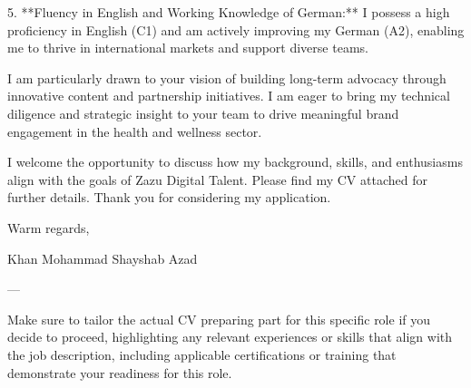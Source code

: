 5. **Fluency in English and Working Knowledge of German:** I possess a high proficiency in English (C1) and am actively improving my German (A2), enabling me to thrive in international markets and support diverse teams.

I am particularly drawn to your vision of building long-term advocacy through innovative content and partnership initiatives. I am eager to bring my technical diligence and strategic insight to your team to drive meaningful brand engagement in the health and wellness sector.

I welcome the opportunity to discuss how my background, skills, and enthusiasms align with the goals of Zazu Digital Talent. Please find my CV attached for further details. Thank you for considering my application.

Warm regards,

Khan Mohammad Shayshab Azad

---

Make sure to tailor the actual CV preparing part for this specific role if you decide to proceed, highlighting any relevant experiences or skills that align with the job description, including applicable certifications or training that demonstrate your readiness for this role.
